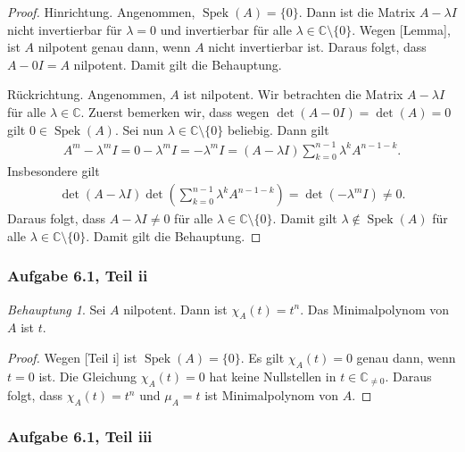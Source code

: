 \documentclass[draft,a5paper]{article}
\theoremstyle{remark}
\newtheorem*{beh}{Behauptung}
\DeclareMathOperator{\Spek}{Spek}
\begin{document}
\begin{proof}
  Hinrichtung.  Angenommen, \(\Spek(A) = \{0\}\).  Dann ist die Matrix
  \(A - \lambda I\) nicht invertierbar für \(\lambda = 0\) und invertierbar für
  alle \(\lambda \in \mathbb{C} \setminus \{0\}\).  Wegen [Lemma], ist
  \(A\) nilpotent genau dann, wenn \(A\) nicht invertierbar ist.
  Daraus folgt, dass \(A - 0I = A\) nilpotent.  Damit gilt die Behauptung.

  Rückrichtung.  Angenommen, \(A\) ist nilpotent.  Wir betrachten die
  Matrix \(A - \lambda I\) für alle \(\lambda \in \mathbb{C}\).  Zuerst bemerken wir, dass
  wegen \(\det(A - 0I) = \det(A) = 0\) gilt \(0 \in \Spek(A)\).  Sei nun
  \(\lambda \in \mathbb{C} \setminus \{0\}\) beliebig.  Dann gilt
  \begin{align*}
    A^{m} - \lambda^{m}I = 0 - \lambda^{m}I = -\lambda^{m}I = (A - \lambda I)\sum_{k=0}^{n-1}{\lambda^{k}A^{n-1-k}}.
  \end{align*}
  Insbesondere gilt
  \begin{align*}
    \det(A - \lambda I) \det(\sum_{k=0}^{n-1}{\lambda^{k}A^{n-1-k}}) = \det(-\lambda^{m} I)
    \ne 0.
  \end{align*}
  Daraus folgt, dass \(A - \lambda I \ne 0\) für alle
  \(\lambda \in \mathbb{C} \setminus \{0\}\).  Damit gilt
  \(\lambda \notin \Spek(A)\) für alle \(\lambda \in \mathbb{C} \setminus \{0\}\).  Damit gilt die Behauptung.
\end{proof}

\subsubsection*{Aufgabe 6.1, Teil ii}

\begin{beh}
  Sei \(A\) nilpotent.  Dann ist \(\chi_{A}(t) = t^{n}\). Das
  Minimalpolynom von \(A\) ist \(t\).
\end{beh}

\begin{proof}
  Wegen [Teil i] ist \( \Spek(A) = \{0\} \).  Es gilt
  \(\chi_{A}(t) = 0\) genau dann, wenn \(t=0\) ist.  Die Gleichung
  \(\chi_{A}(t) = 0\) hat keine Nullstellen in \(t \in \mathbb{C}_{\ne 0}\).  Daraus
  folgt, dass \(\chi_{A}(t) = t^{n}\) und \(\mu_{A} = t\) ist
  Minimalpolynom von \(A\).
\end{proof}

\subsubsection*{Aufgabe 6.1, Teil iii}
\end{document}
